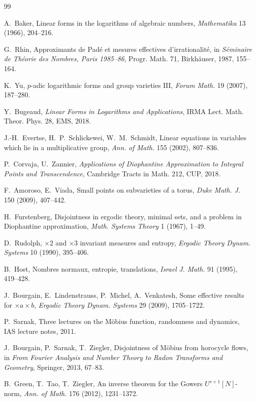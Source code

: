 \documentclass[11pt]{article}
\begin{document}
\begin{thebibliography}{99}

 A.~Baker, Linear forms in the logarithms of algebraic
numbers, \emph{Mathematika} 13 (1966), 204--216.

 G.~Rhin, Approximants de Pad\'e et mesures effectives
d'irrationalit\'e, in \emph{S\'eminaire de Th\'eorie des Nombres,
Paris 1985--86}, Progr. Math. 71, Birkh\"auser, 1987, 155--164.

 K.~Yu, $p$-adic logarithmic forms and group varieties
III, \emph{Forum Math.} 19 (2007), 187--280.

 Y.~Bugeaud, \emph{Linear Forms in Logarithms and
Applications}, IRMA Lect. Math. Theor. Phys. 28, EMS, 2018.

 J.-H.~Evertse, H.~P.~Schlickewei, W.~M.~Schmidt, Linear
equations in variables which lie in a multiplicative group,
\emph{Ann. of Math.} 155 (2002), 807--836.

 P.~Corvaja, U.~Zannier, \emph{Applications of Diophantine
Approximation to Integral Points and Transcendence}, Cambridge Tracts
in Math. 212, CUP, 2018.

 F.~Amoroso, E.~Viada, Small points on subvarieties of a
torus, \emph{Duke Math. J.} 150 (2009), 407--442.

 H.~Furstenberg, Disjointness in ergodic theory,
minimal sets, and a problem in Diophantine approximation,
\emph{Math. Systems Theory} 1 (1967), 1--49.

 D.~Rudolph, $\times2$ and $\times3$ invariant
measures and entropy, \emph{Ergodic Theory Dynam. Systems} 10 (1990),
395--406.

 B.~Host, Nombres normaux, entropie, translations,
\emph{Israel J. Math.} 91 (1995), 419--428.

 J.~Bourgain, E.~Lindenstrauss, P.~Michel,
A.~Venkatesh, Some effective results for $\times a\times b$,
\emph{Ergodic Theory Dynam. Systems} 29 (2009), 1705--1722.

 P.~Sarnak, Three lectures on the M\"obius function,
randomness and dynamics, IAS lecture notes, 2011.

 J.~Bourgain, P.~Sarnak, T.~Ziegler, Disjointness of
M\"obius from horocycle flows, in \emph{From Fourier Analysis and
Number Theory to Radon Transforms and Geometry}, Springer, 2013,
67--83.

 B.~Green, T.~Tao, T.~Ziegler, An inverse theorem for
the Gowers $U^{s+1}[N]$-norm, \emph{Ann. of Math.} 176 (2012),
1231--1372.


\end{thebibliography}
\end{document}
